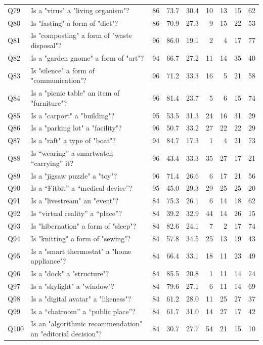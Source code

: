 \begin{scriptsize}
\begin{longtable}{lp{}rrrrrrr}
Q79 & Is a "virus" a "living organism"? & 86 & 73.7 & 30.4 & 10 & 13 & 15 & 62 \\
Q80 & Is "fasting" a form of "diet"? & 86 & 70.9 & 27.3 & 9 & 15 & 22 & 53 \\
Q81 & Is "composting" a form of "waste disposal"? & 96 & 86.0 & 19.1 & 2 & 4 & 17 & 77 \\
Q82 & Is a "garden gnome" a form of "art"? & 94 & 66.7 & 27.2 & 11 & 14 & 35 & 40 \\
Q83 & Is "silence" a form of "communication"? & 96 & 71.2 & 33.3 & 16 & 5 & 21 & 58 \\
Q84 & Is a "picnic table" an item of "furniture"? & 96 & 81.4 & 23.7 & 5 & 6 & 15 & 74 \\
Q85 & Is a "carport" a "building"? & 95 & 53.5 & 31.3 & 24 & 16 & 31 & 29 \\
Q86 & Is a "parking lot" a "facility"? & 96 & 50.7 & 33.2 & 27 & 22 & 22 & 29 \\
Q87 & Is a "raft" a type of "boat"? & 94 & 84.7 & 17.3 & 1 & 4 & 21 & 73 \\
Q88 & Is ``wearing'' a smartwatch ``carrying'' it? & 96 & 43.4 & 33.3 & 35 & 27 & 17 & 21 \\
Q89 & Is a "jigsaw puzzle" a "toy"? & 96 & 71.4 & 26.6 & 6 & 17 & 21 & 56 \\
Q90 & Is a ``Fitbit'' a ``medical device''? & 95 & 45.0 & 29.3 & 29 & 25 & 25 & 20 \\
Q91 & Is a "livestream" an "event"? & 84 & 75.3 & 26.1 & 6 & 14 & 18 & 62 \\
Q92 & Is ``virtual reality'' a ``place''? & 84 & 39.2 & 32.9 & 44 & 14 & 26 & 15 \\
Q93 & Is "hibernation" a form of "sleep"? & 84 & 82.6 & 24.1 & 7 & 2 & 17 & 74 \\
Q94 & Is "knitting" a form of "sewing"? & 84 & 57.8 & 34.5 & 25 & 13 & 19 & 43 \\
Q95 & Is a "smart thermostat" a "home appliance"? & 84 & 66.4 & 33.1 & 18 & 11 & 23 & 49 \\
Q96 & Is a "dock" a "structure"? & 84 & 85.5 & 20.8 & 1 & 11 & 14 & 74 \\
Q97 & Is a "skylight" a "window"? & 84 & 79.6 & 27.1 & 6 & 11 & 14 & 69 \\
Q98 & Is a "digital avatar" a "likeness"? & 84 & 61.2 & 28.0 & 11 & 25 & 27 & 37 \\
Q99 & Is a ``chatroom'' a ``public place''? & 84 & 61.7 & 31.0 & 14 & 27 & 17 & 42 \\
Q100 & Is an "algorithmic recommendation" an "editorial decision"? & 84 & 30.7 & 27.7 & 54 & 21 & 15 & 10 \\
\hline
\end{longtable}
\end{scriptsize}
